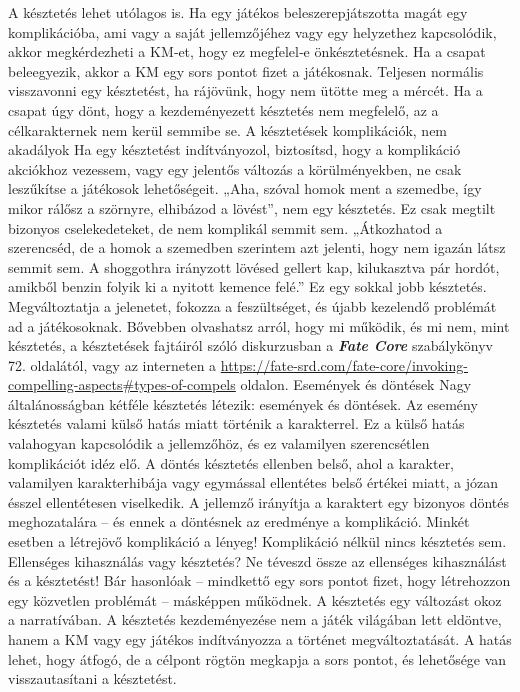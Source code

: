 \documentclass[oneside]{book}
\newcommand{\fate}[1]{\textbf{\textit{#1}}}
\begin{document}
A késztetés lehet utólagos is. Ha egy játékos beleszerepjátszotta magát egy komplikációba, ami vagy a saját jellemzőjéhez vagy egy helyzethez kapcsolódik, akkor megkérdezheti a KM‑et, hogy ez megfelel‑e önkésztetésnek. Ha a csapat beleegyezik, akkor a KM egy sors pontot fizet a játékosnak.
Teljesen normális visszavonni egy késztetést, ha rájövünk, hogy nem ütötte meg a mércét. Ha a csapat úgy dönt, hogy a kezdeményezett késztetés nem megfelelő, az a célkarakternek nem kerül semmibe se.
A késztetések komplikációk, nem akadályok
Ha egy késztetést indítványozol, biztosítsd, hogy a komplikáció akciókhoz vezessem, vagy egy jelentős változás a körülményekben, ne csak leszűkítse a játékosok lehetőségeit.
„Aha, szóval homok ment a szemedbe, így mikor rálősz a szörnyre, elhibázod a lövést”, nem egy késztetés. Ez csak megtilt bizonyos cselekedeteket, de nem komplikál semmit sem.
„Átkozhatod a szerencséd, de a homok a szemedben szerintem azt jelenti, hogy nem igazán látsz semmit sem. A shoggothra irányzott lövésed gellert kap, kilukasztva pár hordót, amikből benzin folyik ki a nyitott kemence felé.” Ez egy sokkal jobb késztetés. Megváltoztatja a jelenetet, fokozza a feszültséget, és újabb kezelendő problémát ad a játékosoknak.
Bővebben olvashatsz arról, hogy mi működik, és mi nem, mint késztetés, a késztetések fajtáiról szóló diskurzusban a \fate{Fate Core} szabálykönyv 72. oldalától, vagy az interneten a \url{https://fate-srd.com/fate-core/invoking-compelling-aspects#types-of-compels} oldalon.
Események és döntések
Nagy általánosságban kétféle késztetés létezik: események és döntések.
Az esemény késztetés valami külső hatás miatt történik a karakterrel. Ez a külső hatás valahogyan kapcsolódik a jellemzőhöz, és ez valamilyen szerencsétlen komplikációt idéz elő.
A döntés késztetés ellenben belső, ahol a karakter, valamilyen karakterhibája vagy egymással ellentétes belső értékei miatt, a józan ésszel ellentétesen viselkedik. A jellemző irányítja a karaktert egy bizonyos döntés meghozatalára – és ennek a döntésnek az eredménye a komplikáció.
Minkét esetben a létrejövő komplikáció a lényeg! Komplikáció nélkül nincs késztetés sem.
Ellenséges kihasználás vagy késztetés?
Ne téveszd össze az ellenséges kihasználást és a késztetést! Bár hasonlóak – mindkettő egy sors pontot fizet, hogy létrehozzon egy közvetlen problémát – másképpen működnek.
A késztetés egy változást okoz a narratívában. A késztetés kezdeményezése nem a játék világában lett eldöntve, hanem a KM vagy egy játékos indítványozza a történet megváltoztatását. A hatás lehet, hogy átfogó, de a célpont rögtön megkapja a sors pontot, és lehetősége van visszautasítani a késztetést.
\end{document}
